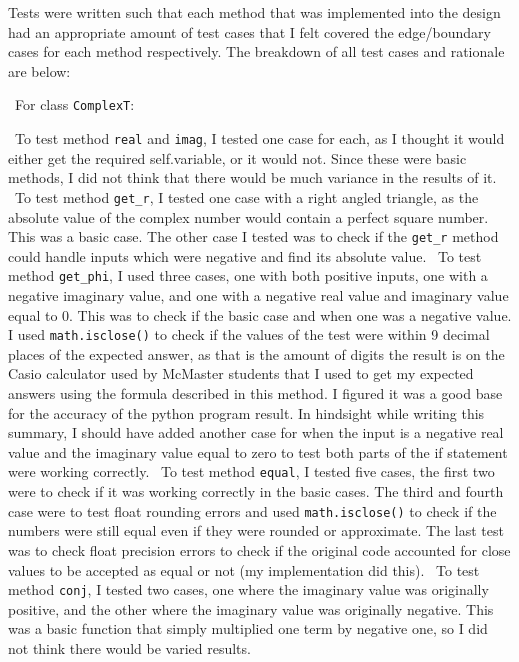 \documentclass[12pt]{article}
\begin{document}
Tests were written such that each method that was implemented into the design
had an appropriate amount of test cases that I felt covered the edge/boundary 
cases for each method respectively. The breakdown of all test cases and 
rationale are below:

~\newline\noindent For class \verb|ComplexT|:

~\newline\noindent To test method \verb|real| and \verb|imag|, I tested one case for each, as I thought it would either get the required self.variable, or it would not. 
Since these were basic methods, I did not think that there would be much variance 
in the results of it. 
~\newline\noindent To test method \verb|get_r|, I tested one case with a right angled triangle, as the absolute value of the complex number would contain a perfect square number. This was a basic case. The other case I tested was to check if the \verb|get_r| method could handle inputs which were negative and find its absolute value. 
~\newline\noindent To test method \verb|get_phi|, I used three cases, one with both positive inputs, one with a negative imaginary value, and one with a negative real value and imaginary value equal to 0. This was to check if the basic case and when one was a negative value. I used \verb|math.isclose()| to check if the values of the test were within 9 decimal places of the expected answer, as that is the amount of digits the result is on the Casio calculator used by McMaster students that I used to get my expected answers using the formula described in this method. I figured it was a good base for the accuracy of the python program result. In hindsight while writing this summary, I should have added another case for when the input is a negative real value and the imaginary value equal to zero to test both parts of the if statement were working correctly. 
~\newline\noindent To test method \verb|equal|, I tested five cases, the first two were to check if it was working correctly in the basic cases. The third and fourth case were to test float rounding errors and used \verb|math.isclose()| to check if the numbers were still equal even if they were rounded or approximate. The last test was to check float precision errors to check if the original code accounted for close values to be accepted as equal or not (my implementation did this).
~\newline\noindent To test method \verb|conj|, I tested two cases, one where the imaginary value was originally positive, and the other where the imaginary value was originally negative. This was a basic function that simply multiplied one term by negative one, so I did not think there would be varied results. 
\end{document}
